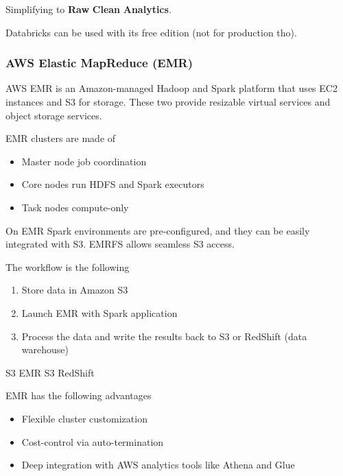 Simplifying to \textbf{Raw} \ra \textbf{Clean} \ra \textbf{Analytics}.

\vspace{10pt}

Databricks can be used with its free edition (not for production tho).



\subsubsection{AWS Elastic MapReduce (EMR)}

AWS EMR is an Amazon-managed Hadoop and Spark platform that uses EC2 instances and S3 for storage. These two provide resizable virtual services and object storage services. 

\vspace{10pt}

EMR clusters are made of

\begin{itemize}
    \item Master node \ra job coordination
    \item Core nodes \ra run HDFS and Spark executors
    \item Task nodes \ra compute-only 
\end{itemize}

On EMR Spark environments are pre-configured, and they can be easily integrated with S3. EMRFS allows seamless S3 access.

\vspace{10pt}

The workflow is the following
\begin{enumerate}
    \item Store data in Amazon S3
    \item Launch EMR with Spark application
    \item Process the data and write the results back to S3 or RedShift (data warehouse)
\end{enumerate}

S3 \ra EMR \ra S3 \ra RedShift

\vspace{10pt}

EMR has the following advantages

\begin{itemize}
    \item Flexible cluster customization
    \item Cost-control via auto-termination
    \item Deep integration with AWS analytics tools like Athena and Glue
\end{itemize}


